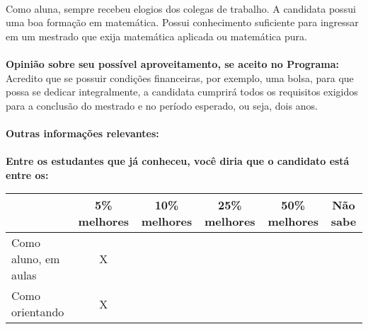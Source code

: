 \documentclass[11pt]{article}
\begin{document}
\\Como aluna, sempre recebeu elogios dos colegas de trabalho. A candidata possui uma boa formação em matemática. Possui conhecimento suficiente para ingressar em um mestrado que exija matemática aplicada ou matemática pura.\\
\\
\textbf{Opinião sobre seu possível aproveitamento, se aceito no Programa:}
\\Acredito que se possuir condições financeiras, por exemplo, uma bolsa, para que possa se dedicar integralmente, a candidata cumprirá todos os requisitos exigidos para a conclusão do mestrado e no período esperado, ou seja, dois anos.\\ 
\\
\textbf{Outras informações relevantes:} \\
\\[0.3cm]
\textbf{Entre os estudantes que já conheceu, você diria que o candidato está entre os:}
\\
\begin{tabular}{|l|c|c|c|c|c|}
\hline
 & 5\% melhores & 10\% melhores & 25\% melhores & 50\% melhores & Não sabe \\
\hline
Como aluno, em aulas & X &  &  &  & \\
\hline
Como orientando & X &  &  &  & \\
\hline
\end{tabular}
\end{document}
